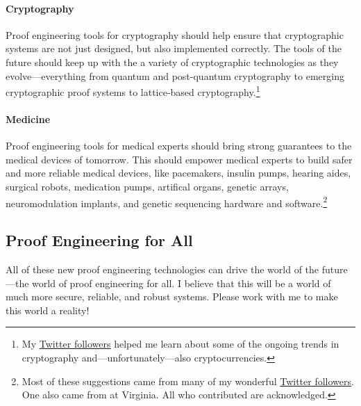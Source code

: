 \paragraph{Cryptography}
Proof engineering tools for cryptography should help ensure that cryptographic systems are not just designed, but also implemented correctly.
The tools of the future should keep up with the a variety of cryptographic technologies as they evolve---everything from quantum and post-quantum cryptography
to emerging cryptographic proof systems to lattice-based cryptography.\footnote{My \href{https://twitter.com/TaliaRinger/status/1391943048465055750}{Twitter followers}
helped me learn about some of the ongoing trends in cryptography and---unfortunately---also cryptocurrencies.} 

\paragraph{Medicine} 
Proof engineering tools for medical experts should bring strong guarantees to the medical devices of tomorrow.
This should empower medical experts to build safer and more reliable medical devices,
like pacemakers, insulin pumps, hearing aides, surgical robots, medication pumps, artifical organs,
genetic arrays, neuromodulation implants, and genetic sequencing hardware and 
software.\footnote{Most of these suggestions came from many of my wonderful \href{https://twitter.com/TaliaRinger/status/1388282607926857731}{Twitter followers}.
One also came from  at Virginia. All who contributed are acknowledged.}


\subsection*{Proof Engineering for All}

All of these new proof engineering technologies can drive the world of the future---the world of proof engineering for all.
I believe that this will be a world of much more secure, reliable, and robust systems.
Please work with me to make this world a reality!

